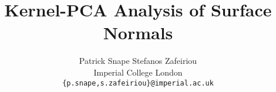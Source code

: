 \documentclass[10pt,twocolumn,letterpaper]{article}
\begin{document}
\title{Kernel-PCA Analysis of Surface Normals}

\author{
Patrick Snape \qquad Stefanos Zafeiriou\\
Imperial College London\\
\texttt{\{p.snape,s.zafeiriou\}@imperial.ac.uk}
}

\maketitle






{\small


}
\end{document}
